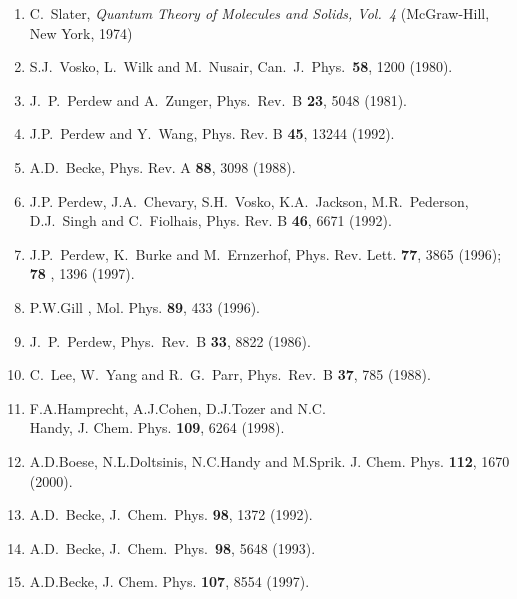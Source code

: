 {\footnotesize
\vspace{8.5cm}
\begin{enumerate}\setlength{\itemsep}{-1\baselineskip}
\setlength{\parsep}{-1\baselineskip}
\item C.~Slater, {\sl Quantum Theory of Molecules and Solids, 
Vol.~4} (McGraw-Hill, New York, 1974) \\
\item  S.J.~Vosko, L.~Wilk and M.~Nusair,
Can.~J.~Phys.~{\bf 58}, 1200 (1980). \\
\item  J.~P.~Perdew and A.~Zunger,  Phys.~Rev.~B {\bf23}, 5048
(1981). \\
\item  J.P.~Perdew and Y.~Wang, Phys. Rev. B {\bf 45},
13244 (1992). \\
\item   A.D.~Becke,  Phys. Rev. A {\bf 88}, 3098 (1988). \\ 
\item  J.P. Perdew,  J.A.~Chevary, S.H.~Vosko, K.A.~Jackson, 
M.R.~Pederson, D.J.~Singh and C.~Fiolhais, Phys. Rev. B {\bf 46}, 6671
(1992). \\
\item  J.P.~Perdew, K.~Burke and M.~Ernzerhof, 
Phys. Rev. Lett. {\bf 77}, 3865 (1996); {\bf 78 }, 1396 (1997).\\
\item  P.W.Gill , Mol. Phys. {\bf 89}, 433 (1996). \\
\item  J.~P.~Perdew, Phys.~Rev.~B   {\bf33}, 8822 (1986). \\
\item C.~Lee, W.~Yang and R.~G.~Parr, Phys.~Rev.~B {\bf 37}, 785
(1988). \\
\item  F.A.Hamprecht, A.J.Cohen, D.J.Tozer and N.C.\\ Handy, 
    J. Chem. Phys. {\bf 109}, 6264 (1998). \\
\item   A.D.Boese, N.L.Doltsinis, N.C.Handy and
M.Sprik. J. Chem. Phys. {\bf 112}, 1670 (2000). \\
\item  A.D.~Becke, J.~Chem.~Phys. {\bf 98}, 1372 (1992). \\
\item  A.D.~Becke, J.~Chem.~Phys.~{\bf 98}, 5648 (1993). \\
\item A.D.Becke, J. Chem. Phys. {\bf 107}, 8554 (1997). \\

\end{enumerate}}
